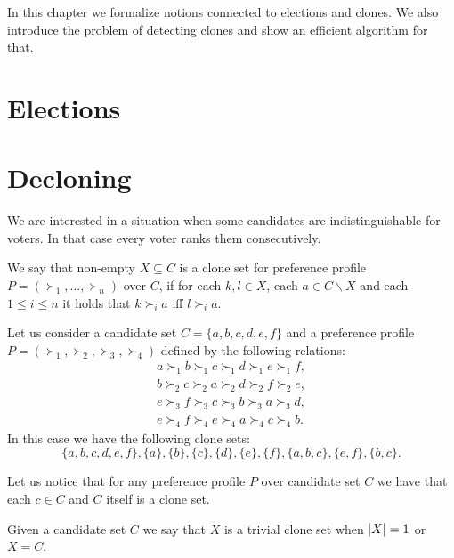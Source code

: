 In this chapter we formalize notions connected to elections and clones.
We also introduce the problem of detecting clones and show an efficient algorithm for that.

\section{Elections} 

\section{Decloning}

We are interested in a situation when some candidates are indistinguishable for voters.
In that case every voter ranks them consecutively.

\begin{defn}
We say that non-empty $X \subseteq C$ is a clone set for preference profile $P = (\succ_1, ... , \succ_n)$ over $C$,
if for each $k,l \in X$, each $a \in C \backslash X$ and each $1 \leq i \leq n $ it holds that
$k \succ_i a$ iff $l \succ_i a$.
\end{defn}

\begin{exmp} \label{clone-sets}
Let us consider a candidate set $C = \{a,b,c,d,e,f\}$
and a preference profile $P = (\succ_1, \succ_2, \succ_3, \succ_4)$ defined by the following relations:
\begin{align*}
a \succ_1 b \succ_1 c \succ_1 d \succ_1 e \succ_1 f, \\
b \succ_2 c \succ_2 a \succ_2 d \succ_2 f \succ_2 e, \\
e \succ_3 f \succ_3 c \succ_3 b \succ_3 a \succ_3 d, \\
e \succ_4 f \succ_4 e \succ_4 a \succ_4 c \succ_4 b.
\end{align*}
In this case we have the following clone sets:
$$\{a,b,c,d,e,f\}, \{a\}, \{b\}, \{c\}, \{d\}, \{e\}, \{f\}, \{a,b,c\}, \{e,f\}, \{b,c\}.$$
\end{exmp}

\begin{rmrk}
Let us notice that for any preference profile $P$ over candidate set $C$
we have that each $c \in C$ and $C$ itself is a clone set.
\end{rmrk}

\begin{defn}
Given a candidate set $C$ we say that $X$ is a trivial clone set
when $\left\vert X \right\vert = 1$ or $X = C$.
\end{defn}

